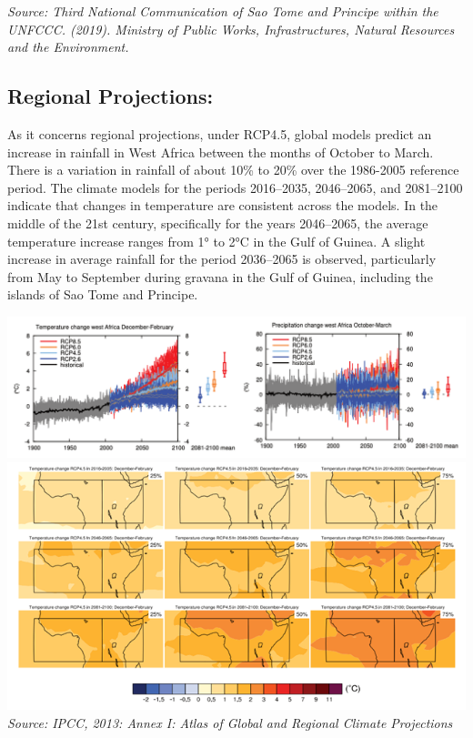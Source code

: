 \documentclass[
]{book}
\begin{document}
\emph{Source: Third National Communication of Sao Tome and Principe within the UNFCCC. (2019). Ministry of Public Works, Infrastructures, Natural Resources and the Environment.}

\hypertarget{regional-projections-1}{%
\subsection{Regional Projections:}\label{regional-projections-1}}

As it concerns regional projections, under RCP4.5, global models predict an increase in rainfall in West Africa between the months of October to March. There is a variation in rainfall of about 10\% to 20\% over the 1986-2005 reference period. The climate models for the periods 2016--2035, 2046--2065, and 2081--2100 indicate that changes in temperature are consistent across the models. In the middle of the 21st century, specifically for the years 2046--2065, the average temperature increase ranges from 1° to 2°C in the Gulf of Guinea. A slight increase in average rainfall for the period 2036--2065 is observed, particularly from May to September during gravana in the Gulf of Guinea, including the islands of Sao Tome and Principe.

\includegraphics{images/pr_temp_proj.png}
\includegraphics{images/proj_atlas.png}
\emph{Source: IPCC, 2013: Annex I: Atlas of Global and Regional Climate Projections}
\end{document}
